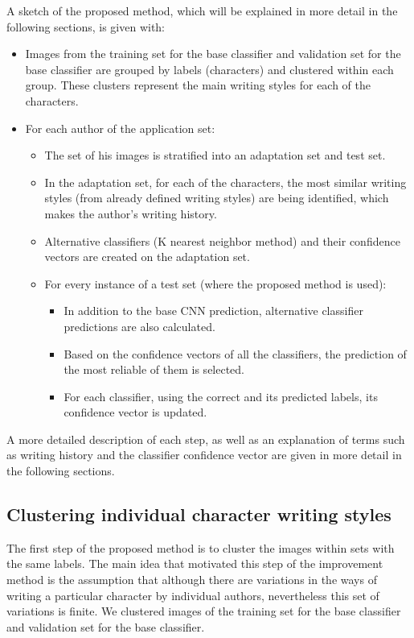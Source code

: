 \documentclass{article}
\begin{document}
A sketch of the proposed method, which will be explained in more detail in the following sections, is given with: 
\begin{itemize}
  \item Images from the training set for the base classifier and validation set for the base classifier are grouped by labels (characters) and clustered within each group. 
  These clusters represent the main writing styles for each of the characters.
  \item For each author of the application set: 
  \begin{itemize}
    \item The set of his images is stratified into an adaptation set and test set. 
    \item In the adaptation set, for each of the characters, the most similar writing styles (from already defined writing styles) are being identified, which makes the author's writing history. 
    \item Alternative classifiers (K nearest neighbor method) and their confidence vectors are created on the adaptation set. 
    \item For every instance of a test set (where the proposed method is used): 
      \begin{itemize}
        \item In addition to the base CNN prediction, alternative classifier predictions are also calculated.
        \item Based on the confidence vectors of all the classifiers, the prediction of the most reliable of them is selected. 
        \item For each classifier, using the correct and its predicted labels, its confidence vector is updated. 
      \end{itemize}
  \end{itemize}
\end{itemize}
A more detailed description of each step, as well as an explanation of terms such as writing history and the classifier confidence vector are given in more detail in the following sections. 

\subsection{Clustering individual character writing styles}

The first step of the proposed method is to cluster the images within sets with the same labels. 
The main idea that motivated this step of the improvement method is the assumption that although there are variations in the ways of writing a particular character by individual authors, nevertheless this set of variations is finite. 
We clustered images of the training set for the base classifier and validation set for the base classifier.
\end{document}
